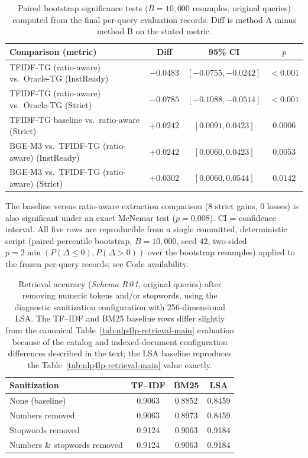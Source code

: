 \documentclass[3p]{elsarticle}
\begin{document}
\begin{table}[t]
\centering
\caption{Paired bootstrap significance tests ($B=10{,}000$ resamples, original queries) computed from the final per-query evaluation records. Diff is method A minus method B on the stated metric.}
\label{tab:nlp4lp-significance}
\small
\setlength{\tabcolsep}{3pt}
\begin{tabular}{lccc}
  \toprule
  Comparison (metric) & Diff & 95\% CI & $p$ \\
  \midrule
  TFIDF-TG (ratio-aware) vs.\ Oracle-TG (InstReady) & $-0.0483$ & $[-0.0755, -0.0242]$ & $<0.001$ \\
  TFIDF-TG (ratio-aware) vs.\ Oracle-TG (Strict) & $-0.0785$ & $[-0.1088, -0.0514]$ & $<0.001$ \\
  TFIDF-TG baseline vs.\ ratio-aware (Strict) & $+0.0242$ & $[0.0091, 0.0423]$ & $0.0006$ \\
  BGE-M3 vs.\ TFIDF-TG (ratio-aware) (InstReady) & $+0.0242$ & $[0.0060, 0.0423]$ & $0.0053$ \\
  BGE-M3 vs.\ TFIDF-TG (ratio-aware) (Strict) & $+0.0302$ & $[0.0060, 0.0544]$ & $0.0142$ \\
  \bottomrule
\end{tabular}

\vspace{2mm}
\raggedright
\footnotesize
The baseline versus ratio-aware extraction comparison (8 strict gains, 0 losses) is also significant under an exact McNemar test ($p=0.008$). CI = confidence interval. All five rows are reproducible from a single committed, deterministic script (paired percentile bootstrap, $B=10{,}000$, seed $42$, two-sided $p=2\min(P(\Delta\leq 0),P(\Delta>0))$ over the bootstrap resamples) applied to the frozen per-query records; see Code availability.
\end{table}

\begin{table}[t]
\centering
\caption{Retrieval accuracy (\textit{Schema R@1}, original queries) after removing numeric tokens and/or stopwords, using the diagnostic sanitization configuration with 256-dimensional LSA. The TF--IDF and BM25 baseline rows differ slightly from the canonical Table~\ref{tab:nlp4lp-retrieval-main} evaluation because of the catalog and indexed-document configuration differences described in the text; the LSA baseline reproduces the Table~\ref{tab:nlp4lp-retrieval-main} value exactly.}
\label{tab:nlp4lp-overlap}
\small
\begin{tabular}{lccc}
  \toprule
  Sanitization & TF--IDF & BM25 & LSA \\
  \midrule
  None (baseline)               & 0.9063 & 0.8852 & 0.8459 \\
  Numbers removed               & 0.9063 & 0.8973 & 0.8459 \\
  Stopwords removed             & 0.9124 & 0.9063 & 0.9184 \\
  Numbers \& stopwords removed  & 0.9124 & 0.9063 & 0.9184 \\
  \bottomrule
\end{tabular}
\end{table}
\end{document}
